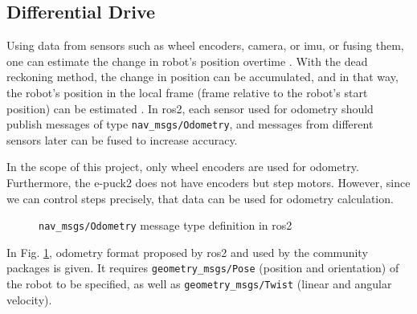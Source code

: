 \subsection{Differential Drive}
\label{sec:simulation:odometry_velocity}

Using data from sensors such as wheel encoders, camera, or \ac{imu}, or fusing them, one can estimate the change in robot's position overtime \cite{shen_localization_2011, nister_visual_2004}.
With the dead reckoning method, the change in position can be accumulated, and in that way, the robot's position in the local frame (frame relative to the robot's start position) can be estimated \cite{ben-ari_elements_2018, astolfi_exponential_1999}.
In \ac{ros2}, each sensor used for odometry should publish messages of type \texttt{nav\_msgs/Odometry}, and messages from different sensors later can be fused to increase accuracy. 

In the scope of this project, only wheel encoders are used for odometry.
Furthermore, the e-puck2 does not have encoders but step motors.
However, since we can control steps precisely, that data can be used for odometry calculation.

\begin{figure}[H]
    \centering
    \begin{subfigure}[b]{0.9\textwidth}
    \end{subfigure}
    \caption{\texttt{nav\_msgs/Odometry} message type definition in \ac{ros2}}
    \label{fig:simulation:odometry}
\end{figure}

In Fig. \ref{fig:simulation:odometry}, odometry format proposed by \ac{ros2} and used by the community packages is given. It requires \texttt{geometry\_msgs/Pose} (position and orientation) of the robot to be specified, as well as \texttt{geometry\_msgs/Twist} (linear and angular velocity).

